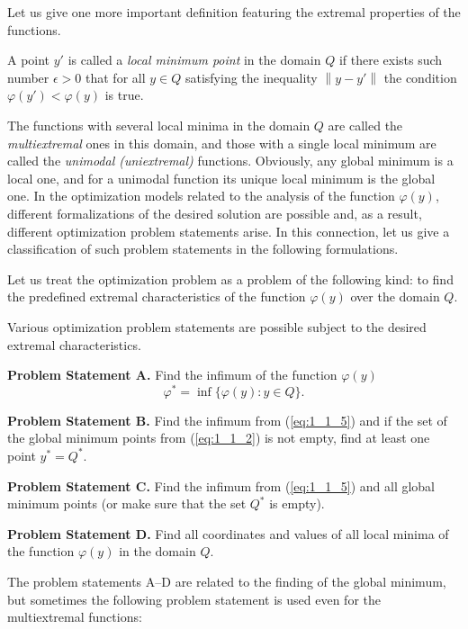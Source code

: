 Let us give one more important definition featuring the extremal properties of the functions.
\begin{definition} 
A point $y'$  is called a \textit {local minimum point} in the domain $Q$ if there exists such number $\epsilon>0$ that for all $y \in Q$ satisfying the inequality $\left\|y-y'\right\|$ the condition $\varphi(y')<\varphi(y)$ is true.
\end{definition}
The functions with several local minima in the domain $Q$ are called the \textit {multiextremal} ones in this domain, and those with a single local minimum are called the \textit {unimodal (uniextremal)} functions. Obviously, any global minimum is a local one, and for a unimodal function its unique local minimum is the global one.
In the optimization models related to the analysis of the function $\varphi(y)$, different formalizations of the desired solution are possible and, as a result, different optimization problem statements arise. In this connection, let us give a classification of such problem statements in the following formulations.
\begin{definition} 
Let us treat the optimization problem as a problem of the following kind: to find the predefined extremal characteristics of the function $\varphi(y)$ over the domain $Q$.
\end{definition}
Various optimization problem statements are possible subject to the desired extremal characteristics.

\textbf{Problem Statement A.} Find the infimum of the function $\varphi(y)$
\begin{equation}
\label{eq:1_1_5}
\varphi^*=\inf\{\varphi(y):y \in Q\}.
\end{equation}

\textbf{Problem Statement B.} Find the infimum from (\ref{eq:1_1_5}) and if the set of the global minimum points from (\ref{eq:1_1_2}) is not empty, find at least one point $y^*=Q^*$.

\textbf{Problem Statement C.} Find the infimum from (\ref{eq:1_1_5})  and all global minimum points (or make sure that the set $Q^*$ is empty).

\textbf{Problem Statement D.} Find all coordinates and values of all local minima of the function $\varphi(y)$ in the domain $Q$.

The problem statements A--D are related to the finding of the global minimum, but sometimes the following problem statement is used even for the multiextremal functions:

